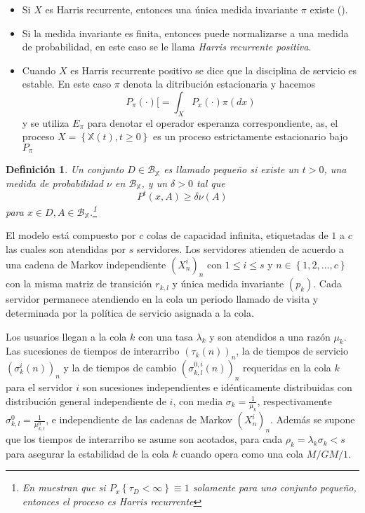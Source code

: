 \documentclass{article}
\newtheorem{Def}{Definición}[section]
\numberwithin{equation}{section}
\begin{document}
\begin{itemize}
\item Si $X$ es Harris recurrente, entonces una \'unica medida
invariante $\pi$ existe (\cite{Getoor}). \item Si la medida
invariante es finita, entonces puede normalizarse a una medida de
probabilidad, en este caso se le llama {\em Harris recurrente
positiva}. \item Cuando $X$ es Harris recurrente positivo se dice
que la disciplina de servicio es estable. En este caso $\pi$
denota la ditribuci\'on estacionaria y hacemos
\[P_{\pi}\left(\cdot\right)[=\int_{X}P_{x}\left(\cdot\right)\pi\left(dx\right)\]
y se utiliza $E_{\pi}$ para denotar el operador esperanza
correspondiente, as, el proceso
$X=\left\{\mathbb{X}\left(t\right),t\geq0\right\}$ es un proceso
estrictamente estacionario bajo $P_{\pi}$
\end{itemize}

\begin{Def}
Un conjunto $D\in\mathcal{B}_\mathbb{X}$ es llamado peque\~no si
existe un $t>0$, una medida de probabilidad $\nu$ en
$\mathcal{B}_\mathbb{X}$, y un $\delta>0$ tal que
\[P^{t}\left(x,A\right)\geq\delta\nu\left(A\right)\] para $x\in
D,A\in\mathcal{B}_\mathbb{X}$.\footnote{En \cite{MeynTweedie}
muestran que si $P_{x}\left\{\tau_{D}<\infty\right\}\equiv1$
solamente para uno conjunto peque\~no, entonces el proceso es
Harris recurrente}
\end{Def}

El modelo est\'a compuesto por $c$ colas de capacidad infinita,
etiquetadas de $1$ a $c$ las cuales son atendidas por $s$
servidores. Los servidores atienden de acuerdo a una cadena de
Markov independiente $\left(X^{i}_{n}\right)_{n}$ con $1\leq i\leq
s$ y $n\in\left\{1,2,\ldots,c\right\}$ con la misma matriz de
transici\'on $r_{k,l}$ y \'unica medida invariante
$\left(p_{k}\right)$. Cada servidor permanece atendiendo en la
cola un periodo llamado de visita y determinada por la pol\'itica de
servicio asignada a la cola.

Los usuarios llegan a la cola $k$ con una tasa $\lambda_{k}$ y son
atendidos a una raz\'on $\mu_{k}$. Las sucesiones de tiempos de
interarribo $\left(\tau_{k}\left(n\right)\right)_{n}$, la de
tiempos de servicio
$\left(\sigma_{k}^{i}\left(n\right)\right)_{n}$ y la de tiempos de
cambio $\left(\sigma_{k,l}^{0,i}\left(n\right)\right)_{n}$
requeridas en la cola $k$ para el servidor $i$ son sucesiones
independientes e id\'enticamente distribuidas con distribuci\'on
general independiente de $i$, con media
$\sigma_{k}=\frac{1}{\mu_{k}}$, respectivamente
$\sigma_{k,l}^{0}=\frac{1}{\mu_{k,l}^{0}}$, e independiente de las
cadenas de Markov $\left(X^{i}_{n}\right)_{n}$. Adem\'as se supone
que los tiempos de interarribo se asume son acotados, para cada
$\rho_{k}=\lambda_{k}\sigma_{k}<s$ para asegurar la estabilidad de
la cola $k$ cuando opera como una cola $M/GM/1$.
\end{document}
